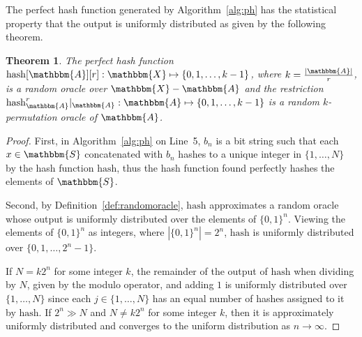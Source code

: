 \documentclass[hidelinks,11pt,final]{article}
\newcommand{\envnumstyle}{section}
\theoremstyle{plain}
\newtheorem{theorem}{Theorem}[\envnumstyle]
\begin{document}
The perfect hash function generated by Algorithm~\ref{alg:ph} has the statistical property that the output is uniformly distributed as given by the following theorem.
\begin{theorem}
The perfect hash function $\mathrm{hash}[\mathbbm{A}][r] : \mathbbm{X} \mapsto \{0,1,\ldots,k-1\}$, where $k = \frac{|\mathbbm{A}|}{r}$, is a random oracle over $\mathbbm{X} - \mathbbm{A}$ and the restriction $\mathrm{hash}_\mathbbm{A}^r| _{\mathbbm{A}} : \mathbbm{A} \mapsto \{0,1,\ldots,k-1\}$ is a random $k$-permutation oracle of $\mathbbm{A}$.
\end{theorem}
\begin{proof}
First, in Algorithm~\ref{alg:ph} on Line~5, $b_n$ is a bit string such that each $x \in \mathbbm{S}$ concatenated with $b_n$ hashes to a unique integer in $\{1,\ldots,N\}$ by the hash function $\mathrm{hash}$, thus the hash function found perfectly hashes the elements of $\mathbbm{S}$. 

Second, by Definition~\ref{def:randomoracle}, $\mathrm{hash}$ approximates a random oracle whose output is uniformly distributed over the elements of $\{0,1\}^{n}$. Viewing the elements of $\{0,1\}^{n}$ as integers, where $|\{0,1\}^n| = 2^n$, $\mathrm{hash}$ is uniformly distributed over $\{0,1,\ldots,2^n-1\}$.

If $N = k 2^n$ for some integer $k$, the remainder of the output of $\mathrm{hash}$ when dividing by $N$, given by the modulo operator, and adding $1$ is uniformly distributed over $\{1,\ldots,N\}$ since each $j \in \{1,\ldots,N\}$ has an equal number of hashes assigned to it by $\mathrm{hash}$. If $2^n \gg N$ and $N \neq k 2^n$ for some integer $k$, then it is approximately uniformly distributed and converges to the uniform distribution as $n \to \infty$.
\end{proof}
\end{document}

